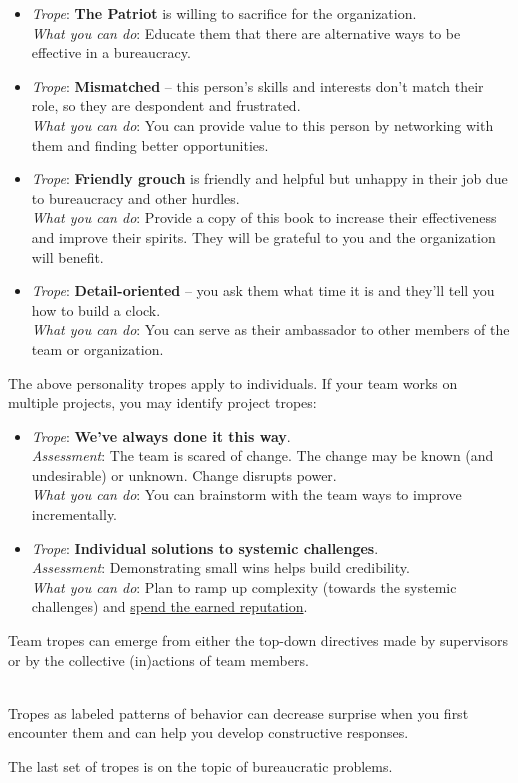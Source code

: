 \begin{itemize}
    \item \textit{Trope}: \textbf{The Patriot} is willing to sacrifice for the organization. \\
    \textit{What you can do}: Educate them that there are alternative ways to be effective in a bureaucracy.
    
    \item \textit{Trope}: \textbf{Mismatched} -- this person's skills and interests don't match their role, so they are despondent and frustrated. \\
    \textit{What you can do}: You can provide value to this person by networking with them and finding better opportunities.
    
    \item \textit{Trope}: \textbf{Friendly grouch} is friendly and helpful but unhappy in their job due to bureaucracy and other hurdles. \\
    \textit{What you can do}: Provide a copy of this book to increase their effectiveness and improve their spirits. They will be grateful to you and the organization will benefit.
    
    \item \textit{Trope}: \textbf{Detail-oriented} -- you ask them what time it is and they'll tell you how to build a clock. \\
    \textit{What you can do}: You can serve as their ambassador to other members of the team or organization.  
\end{itemize}


The above personality tropes apply to individuals. If your team works on multiple projects, you may identify project tropes:
\begin{itemize}
    \item \textit{Trope}: \textbf{We've always done it this way}.\\
    \textit{Assessment}: The team is scared of change. The change may be known (and undesirable) or unknown. Change disrupts power.\\
    \textit{What you can do}: You can brainstorm with the team ways to improve incrementally. 

    \item \textit{Trope}: \textbf{Individual solutions to systemic challenges}.\\
    \textit{Assessment}: Demonstrating small wins helps build credibility. \\
    \textit{What you can do}: Plan to ramp up  complexity (towards the systemic challenges) and \hyperref[sec:reputation]{spend the earned reputation}.
\end{itemize}
Team tropes can emerge from either the top-down directives made by supervisors or by the collective (in)actions of team members.


\ \\


Tropes as labeled patterns of behavior can decrease surprise when you first encounter them and can help you develop constructive responses. 

The last set of tropes is on the topic of bureaucratic problems. 